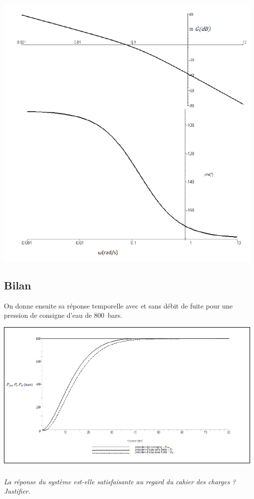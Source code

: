 \documentclass[10pt,fleqn]{article} %
\begin{document}
\begin{multicols}{2}
\begin{center}
\includegraphics[width=.8\linewidth]{images/fig_08}
\end{center}

\subsection*{Bilan}
On donne ensuite sa réponse temporelle avec et sans débit de fuite pour une pression de consigne d’eau de \SI{800}{bars}.


\begin{center}
\includegraphics[width=.8\linewidth]{images/fig_09}
\end{center}

\subparagraph{}
\textit{La réponse du système est-elle satisfaisante au regard du cahier des charges ? Justifier.}
\ifprof
\begin{corrige}

\end{corrige}
\else
\fi



\end{multicols}
\end{document}

